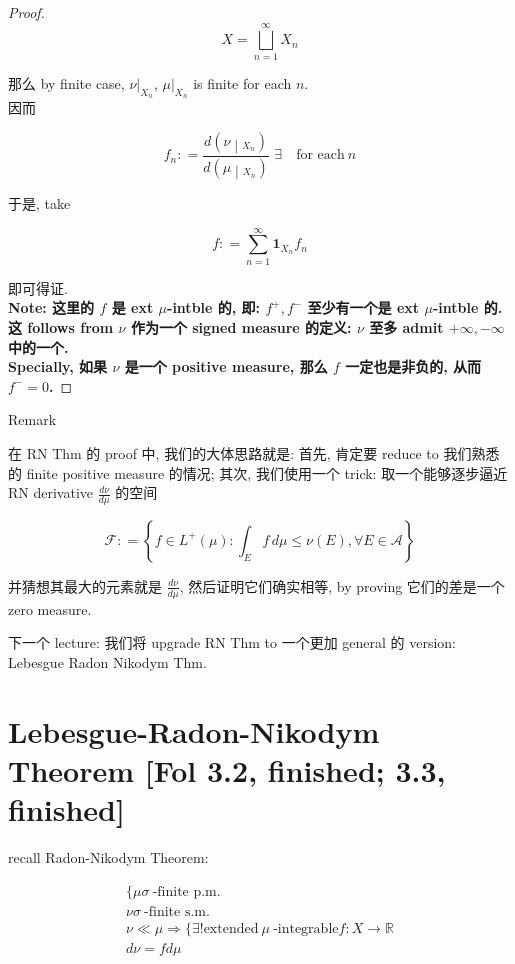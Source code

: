 \begin{proof}
\[X = \bigsqcup\limits_{n = 1}^{\infty}X_{n}\]

那么 by finite case, \(\nu|_{X_{n}}\), \(\mu|_{X_{n}}\) is finite for each \(n\).\\
因而

\[f_{n}: = \frac{\left. d(\nu \middle| {}_{X_{n}}) \right.}{\left. d(\mu \middle| {}_{X_{n}}) \right.}\,\,\exists\quad\text{for each}\ n\]

于是, take

\[f: = \sum\limits_{n = 1}^{\infty}\mathbf{1}_{X_{n}}f_{n}\]

即可得证.\\
\textbf{Note: 这里的 \(f\) 是 ext \(\mu\)-intble 的, 即: \(f^{+},f^{-}\) 至少有一个是 ext \(\mu\)-intble 的. 这 follows from \(\nu\) 作为一个 signed measure 的定义: \(\nu\) 至多 admit \(+ \infty, - \infty\) 中的一个.\\
Specially, 如果 \(\nu\) 是一个 positive measure, 那么 \(f\) 一定也是非负的, 从而 \(f^{-} = 0\).}

\end{proof}

\begin{qlremark}{Remark}

在 RN Thm 的 proof 中, 我们的大体思路就是: 首先, 肯定要 reduce to 我们熟悉的 finite positive measure 的情况; 其次, 我们使用一个 trick: 取一个能够逐步逼近 RN derivative \(\frac{d\nu}{d\mu}\) 的空间

\[\mathcal{F}: = \left\{ {f \in L^{+}(\mu):\int_{E}f\, d\mu \leq \nu(E),\forall E \in \mathcal{A}} \right\}\]

并猜想其最大的元素就是 \(\frac{d\nu}{d\mu}\), 然后证明它们确实相等, by proving 它们的差是一个 zero measure.

\end{qlremark}

下一个 lecture: 我们将 upgrade RN Thm to 一个更加 general 的 version: Lebesgue Radon Nikodym Thm.

\section{Lebesgue-Radon-Nikodym Theorem {[}Fol 3.2, finished; 3.3, finished{]}}

recall Radon-Nikodym Theorem:

\[\begin{matrix}
{\{\mu\sigma\ \text{-finite p.m.}} \\
{\nu\sigma\ \text{-finite s.m.}} \\
{\nu \ll \mu\Longrightarrow\{\exists!\text{extended}\ \mu\ \text{-integrable} f:X\rightarrow\mathbb{R}} \\
{d\nu = fd\mu}
\end{matrix}\]

